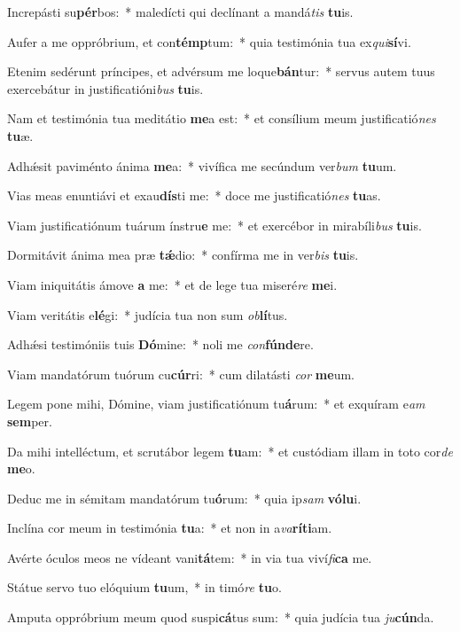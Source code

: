 \item Increpásti su\textbf{pér}bos:~* maledícti qui declínant a mandá\textit{tis} \textbf{tu}is.
\item Aufer a me oppróbrium, et con\textbf{témp}tum:~* quia testimónia tua ex\textit{qui}\textbf{sí}vi.
\item Etenim sedérunt príncipes, et advérsum me loque\textbf{bán}tur:~* servus autem tuus exercebátur in justificatióni\textit{bus} \textbf{tu}is.
\item Nam et testimónia tua meditátio \textbf{me}a est:~* et consílium meum justificatió\textit{nes} \textbf{tu}æ.
\item Adhǽsit paviménto ánima \textbf{me}a:~* vivífica me secúndum ver\textit{bum} \textbf{tu}um.
\item Vias meas enuntiávi et exau\textbf{dís}ti me:~* doce me justificatió\textit{nes} \textbf{tu}as.
\item Viam justificatiónum tuárum ínstru\textbf{e} me:~* et exercébor in mirabíli\textit{bus} \textbf{tu}is.
\item Dormitávit ánima mea præ \textbf{tǽ}dio:~* confírma me in ver\textit{bis} \textbf{tu}is.
\item Viam iniquitátis ámove \textbf{a} me:~* et de lege tua miseré\textit{re} \textbf{me}i.
\item Viam veritátis e\textbf{lé}gi:~* judícia tua non sum \textit{ob}\textbf{lí}tus.
\item Adhǽsi testimóniis tuis \textbf{Dó}mine:~* noli me \textit{con}\textbf{fún}\textbf{de}re.
\item Viam mandatórum tuórum cu\textbf{cúr}ri:~* cum dilatásti \textit{cor} \textbf{me}um.
\item Legem pone mihi, Dómine, viam justificatiónum tu\textbf{á}rum:~* et exquíram e\textit{am} \textbf{sem}per.
\item Da mihi intelléctum, et scrutábor legem \textbf{tu}am:~* et custódiam illam in toto cor\textit{de} \textbf{me}o.
\item Deduc me in sémitam mandatórum tu\textbf{ó}rum:~* quia ip\textit{sam} \textbf{vó}\textbf{lu}i.
\item Inclína cor meum in testimónia \textbf{tu}a:~* et non in a\textit{va}\textbf{rí}\textbf{ti}am.
\item Avérte óculos meos ne vídeant vani\textbf{tá}tem:~* in via tua viví\textit{fi}\textbf{ca} me.
\item Státue servo tuo elóquium \textbf{tu}um,~* in timó\textit{re} \textbf{tu}o.
\item Amputa oppróbrium meum quod suspi\textbf{cá}tus sum:~* quia judícia tua \textit{ju}\textbf{cún}da.
